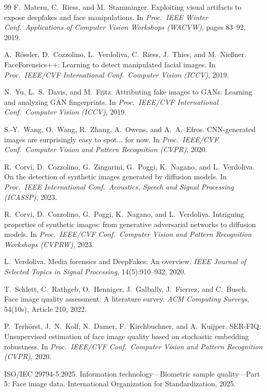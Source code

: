 \documentclass[10pt,twocolumn]{article}
\begin{document}
\begin{thebibliography}{99}
F.~Matern, C.~Riess, and M.~Stamminger.
Exploiting visual artifacts to expose deepfakes and face manipulations.
In \emph{Proc.\ IEEE Winter Conf.\ Applications of Computer Vision Workshops (WACVW)}, pages 83--92, 2019.

A.~R{\"o}ssler, D.~Cozzolino, L.~Verdoliva, C.~Riess, J.~Thies, and M.~Nie{\ss}ner.
{FaceForensics++}: Learning to detect manipulated facial images.
In \emph{Proc.\ IEEE/CVF International Conf.\ Computer Vision (ICCV)}, 2019.

N.~Yu, L.~S.~Davis, and M.~Fritz.
Attributing fake images to {GAN}s: Learning and analyzing {GAN} fingerprints.
In \emph{Proc.\ IEEE/CVF International Conf.\ Computer Vision (ICCV)}, 2019.

S.-Y.~Wang, O.~Wang, R.~Zhang, A.~Owens, and A.~A.~Efros.
{CNN}-generated images are surprisingly easy to spot... for now.
In \emph{Proc.\ IEEE/CVF Conf.\ Computer Vision and Pattern Recognition (CVPR)}, 2020.

R.~Corvi, D.~Cozzolino, G.~Zingarini, G.~Poggi, K.~Nagano, and L.~Verdoliva.
On the detection of synthetic images generated by diffusion models.
In \emph{Proc.\ IEEE International Conf.\ Acoustics, Speech and Signal Processing (ICASSP)}, 2023.

R.~Corvi, D.~Cozzolino, G.~Poggi, K.~Nagano, and L.~Verdoliva.
Intriguing properties of synthetic images: from generative adversarial networks to diffusion models.
In \emph{Proc.\ IEEE/CVF Conf.\ Computer Vision and Pattern Recognition Workshops (CVPRW)}, 2023.

L.~Verdoliva.
Media forensics and {DeepFakes}: An overview.
\emph{IEEE Journal of Selected Topics in Signal Processing}, 14(5):910--932, 2020.

T.~Schlett, C.~Rathgeb, O.~Henniger, J.~Galbally, J.~Fierrez, and C.~Busch.
Face image quality assessment: A literature survey.
\emph{ACM Computing Surveys}, 54(10s), Article 210, 2022.

P.~Terh{\"o}rst, J.~N.~Kolf, N.~Damer, F.~Kirchbuchner, and A.~Kuijper.
{SER-FIQ}: Unsupervised estimation of face image quality based on stochastic embedding robustness.
In \emph{Proc.\ IEEE/CVF Conf.\ Computer Vision and Pattern Recognition (CVPR)}, 2020.

ISO/IEC 29794-5:2025.
Information technology---Biometric sample quality---Part 5: Face image data.
International Organization for Standardization, 2025.


\end{thebibliography}
\end{document}
